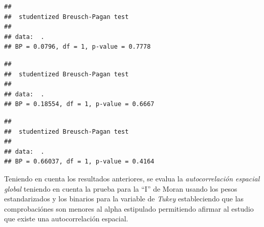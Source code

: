 \documentclass[11pt,]{article}
\newenvironment{Shaded}{\begin{snugshade}}{\end{snugshade}}
\newcommand{\KeywordTok}[1]{\textcolor[rgb]{0.13,0.29,0.53}{\textbf{#1}}}
\newcommand{\DataTypeTok}[1]{\textcolor[rgb]{0.13,0.29,0.53}{#1}}
\newcommand{\StringTok}[1]{\textcolor[rgb]{0.31,0.60,0.02}{#1}}
\newcommand{\OperatorTok}[1]{\textcolor[rgb]{0.81,0.36,0.00}{\textbf{#1}}}
\newcommand{\NormalTok}[1]{#1}
\begin{document}
\begin{Shaded}
\end{Shaded}

\begin{verbatim}
## 
##  studentized Breusch-Pagan test
## 
## data:  .
## BP = 0.0796, df = 1, p-value = 0.7778
\end{verbatim}

\begin{Shaded}
\end{Shaded}

\begin{verbatim}
## 
##  studentized Breusch-Pagan test
## 
## data:  .
## BP = 0.18554, df = 1, p-value = 0.6667
\end{verbatim}

\begin{Shaded}
\end{Shaded}

\begin{verbatim}
## 
##  studentized Breusch-Pagan test
## 
## data:  .
## BP = 0.66037, df = 1, p-value = 0.4164
\end{verbatim}

Teniendo en cuenta los resultados anteriores, se evalua la
\emph{autocorrelación espacial global} teniendo en cuenta la prueba para
la ``I'' de Moran usando los pesos estandarizados y los binarios para la
variable de \emph{Tukey} estableciendo que las comprobaciónes son
menores al alpha estipulado permitiendo afirmar al estudio que existe
una autocorrelación espacial.

\begin{Shaded}
\end{Shaded}
\end{document}
